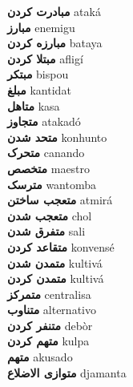 \textbf{ مبادرت کردن  } ataká \\
\textbf{ مبارز  } enemigu \\
\textbf{ مبارزه کردن  } bataya \\
\textbf{ مبتلا کردن  } afligí \\
\textbf{ مبتکر  } bispou \\
\textbf{ مبلغ  } kantidat \\
\textbf{ متاهل  } kasa \\
\textbf{ متجاوز  } atakadó \\
\textbf{ متحد شدن  } konhunto \\
\textbf{ متحرک  } canando \\
\textbf{ متخصص  } maestro \\
\textbf{ مترسک  } wantomba \\
\textbf{ متعجب ساختن  } atmirá \\
\textbf{ متعجب شدن  } chol \\
\textbf{ متفرق شدن  } sali \\
\textbf{ متقاعد کردن  } konvensé \\
\textbf{ متمدن شدن  } kultivá \\
\textbf{ متمدن کردن  } kultivá \\
\textbf{ متمرکز  } centralisa \\
\textbf{ متناوب  } alternativo \\
\textbf{ متنفر کردن  } debòr \\
\textbf{ متهم کردن  } kulpa \\
\textbf{ متهم  } akusado \\
\textbf{ متوازی الاضلاع  } djamanta \\
